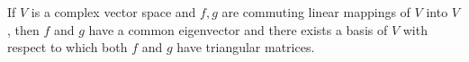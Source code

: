 If $V$ is a complex vector space and $f, g$ are commuting linear mappings of $V$ into $V$, then $f$ and $g$ have a common eigenvector and there exists a basis of $V$ with respect to which both $f$ and $g$ have triangular matrices.
